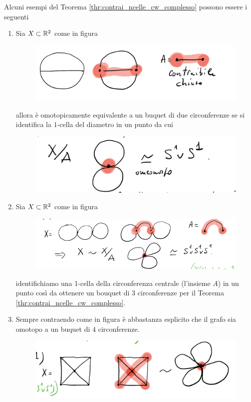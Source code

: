 \begin{remark}
	Alcuni esempi del Teorema \ref{thr:contrai_ncelle_cw_complesso} possono essere i seguenti
	\begin{enumerate}
		\item Sia $X \subset \mathbb{R}^2$ come in figura 
		\begin{figure}[H]
			\centering
			\includegraphics[width=0.6\linewidth]{images/topologia_algebrica/CWCOMPLEXEsempio1}
			\caption{}
			\label{fig:cwcomplexesempio1}
		\end{figure}
		allora è omotopicamente equivalente a un buquet di due circonferenze se si identifica la $1$-cella del diametro in un punto da cui
		\begin{figure}[H]
			\centering
			\includegraphics[width=0.6\linewidth]{images/topologia_algebrica/CWCOMPLEXEsempio2}
			\caption{}
			\label{fig:cwcomplexesempio2}
		\end{figure}
		\item Sia $X \subset \mathbb{R}^2$ come in figura 
			\begin{figure}[H]
				\centering
				\includegraphics[width=0.7\linewidth]{images/topologia_algebrica/CWCOMPLEXEsempio3.png}
				\caption{}
				\label{fig:cwcomplexesempio3}
			\end{figure}
			identifichiamo una 1-cella della circonferenza centrale (l'insieme $A$) in un punto così da ottenere un bouquet di $3$ circonferenze per il Teorema \ref{thr:contrai_ncelle_cw_complesso}.   
		\item Sempre contraendo come in figura è abbastanza esplicito  che il grafo sia omotopo a un buquet di $4$ circonferenze.
			\begin{figure}[H]
				\centering
				\includegraphics[width=0.7\linewidth]{images/topologia_algebrica/CWCOMPLEXEsempio8.png}

\end{figure}
\end{enumerate}
\end{remark}
